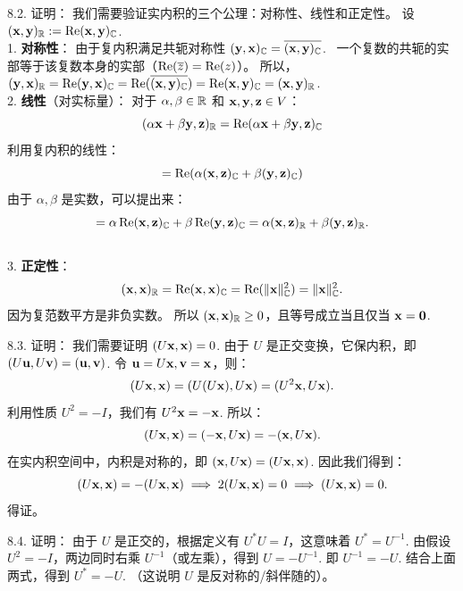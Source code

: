\begin{exer}
8.2. 证明：
我们需要验证实内积的三个公理：对称性、线性和正定性。
设 $(\xx, \yy)_{\RR} := \ReR(\xx, \yy)_{\CC}$.
\\
1.  \textbf{对称性}：
    由于复内积满足共轭对称性 $(\yy, \xx)_{\CC} = \overline{(\xx, \yy)_{\CC}}$.~
    一个复数的共轭的实部等于该复数本身的实部（$\ReR(\overline{z}) = \ReR(z)$）。
    所以，$(\yy, \xx)_{\RR} = \ReR(\yy, \xx)_{\CC} = \ReR(\overline{(\xx, \yy)_{\CC}}) = \ReR(\xx, \yy)_{\CC} = (\xx, \yy)_{\RR}$.
\\
2.  \textbf{线性}（对实标量）：
    对于 $\alpha, \beta \in \RR$ 和 $\xx, \yy, \zz \in V$：
    $$ (\alpha \xx + \beta \yy, \zz)_{\RR} = \ReR(\alpha \xx + \beta \yy, \zz)_{\CC} $$
    利用复内积的线性：
    $$ = \ReR(\alpha (\xx, \zz)_{\CC} + \beta (\yy, \zz)_{\CC}) $$
    由于 $\alpha, \beta$ 是实数，可以提出来：
    $$ = \alpha \ReR(\xx, \zz)_{\CC} + \beta \ReR(\yy, \zz)_{\CC} = \alpha (\xx, \zz)_{\RR} + \beta (\yy, \zz)_{\RR}. $$
\\
3.  \textbf{正定性}：
    $$ (\xx, \xx)_{\RR} = \ReR(\xx, \xx)_{\CC} = \ReR(\|\xx\|_{\CC}^2) = \|\xx\|_{\CC}^2. $$
    因为复范数平方是非负实数。
    所以 $(\xx, \xx)_{\RR} \ge 0$，且等号成立当且仅当 $\xx = \oo$.

8.3. 证明：
我们需要证明 $(U\xx, \xx) = 0$.
由于 $U$ 是正交变换，它保内积，即 $(U\uu, U\vv) = (\uu, \vv)$.
令 $\uu = U\xx, \vv = \xx$，则：
$$ (U\xx, \xx) = (U(U\xx), U\xx) = (U^2 \xx, U\xx). $$
利用性质 $U^2 = -I$，我们有 $U^2 \xx = -\xx$.
所以：
$$ (U\xx, \xx) = (-\xx, U\xx) = -(\xx, U\xx). $$
在实内积空间中，内积是对称的，即 $(\xx, U\xx) = (U\xx, \xx)$.
因此我们得到：
$$ (U\xx, \xx) = -(U\xx, \xx) \implies 2(U\xx, \xx) = 0 \implies (U\xx, \xx) = 0. $$
得证。

8.4. 证明：
由于 $U$ 是正交的，根据定义有 $U^* U = I$，这意味着 $U^* = U^{-1}$.
由假设 $U^2 = -I$，两边同时右乘 $U^{-1}$（或左乘），得到 $U = -U^{-1}$.
即 $U^{-1} = -U$.
结合上面两式，得到 $U^* = -U$.
（这说明 $U$ 是反对称的/斜伴随的）。


\end{exer}
